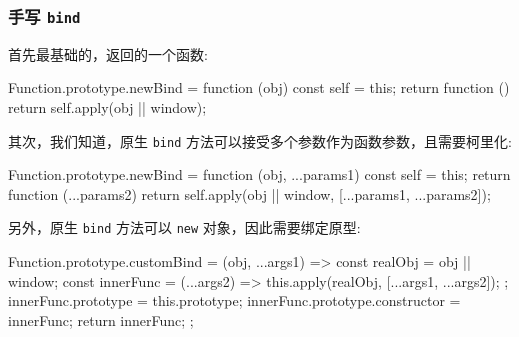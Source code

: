 \subsubsection*{手写 \texttt{bind}}

首先最基础的，返回的一个函数:

\begin{JavaScript}
Function.prototype.newBind = function (obj) {
  const self = this;
  return function () {
    return self.apply(obj || window);
  }
}
\end{JavaScript}

其次，我们知道，原生 \texttt{bind} 方法可以接受多个参数作为函数参数，且需要柯里化:

\begin{JavaScript}
Function.prototype.newBind = function (obj, ...params1) {
  const self = this;
  return function (...params2) {
    return self.apply(obj || window, [...params1, ...params2]);
  }
}
\end{JavaScript}

另外，原生 \texttt{bind} 方法可以 \texttt{new} 对象，因此需要绑定原型:

\begin{JavaScript}
Function.prototype.customBind = (obj, ...args1) => {
  const realObj = obj || window;
  const innerFunc = (...args2) => {
    this.apply(realObj, [...args1, ...args2]);
  };
  innerFunc.prototype = this.prototype;
  innerFunc.prototype.constructor = innerFunc;
  return innerFunc;
};
\end{JavaScript}